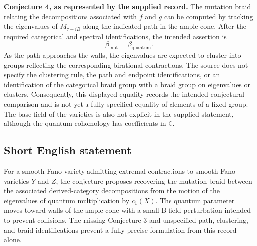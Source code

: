 \documentclass[11pt]{article}
\newcommand{\C}{\mathbb{C}}
\begin{document}
\textbf{Conjecture 4, as represented by the supplied record.} The mutation braid relating the decompositions associated with \(f\) and \(g\) can be computed by tracking the eigenvalues of \(M_{\tau+iB}\) along the indicated path in the ample cone. After the required categorical and spectral identifications, the intended assertion is
\[
\beta_{\mathrm{mut}}=\beta_{\mathrm{quantum}}.
\]
As the path approaches the walls, the eigenvalues are expected to cluster into groups reflecting the corresponding birational contractions. The source does not specify the clustering rule, the path and endpoint identifications, or an identification of the categorical braid group with a braid group on eigenvalues or clusters. Consequently, this displayed equality records the intended conjectural comparison and is not yet a fully specified equality of elements of a fixed group. The base field of the varieties is also not explicit in the supplied statement, although the quantum cohomology has coefficients in \(\C\).
\subsection{Short English statement}
For a smooth Fano variety admitting extremal contractions to smooth Fano varieties \(Y\) and \(Z\), the conjecture proposes recovering the mutation braid between the associated derived-category decompositions from the motion of the eigenvalues of quantum multiplication by \(c_1(X)\). The quantum parameter moves toward walls of the ample cone with a small B-field perturbation intended to prevent collisions. The missing Conjecture 3 and unspecified path, clustering, and braid identifications prevent a fully precise formulation from this record alone.
\end{document}
